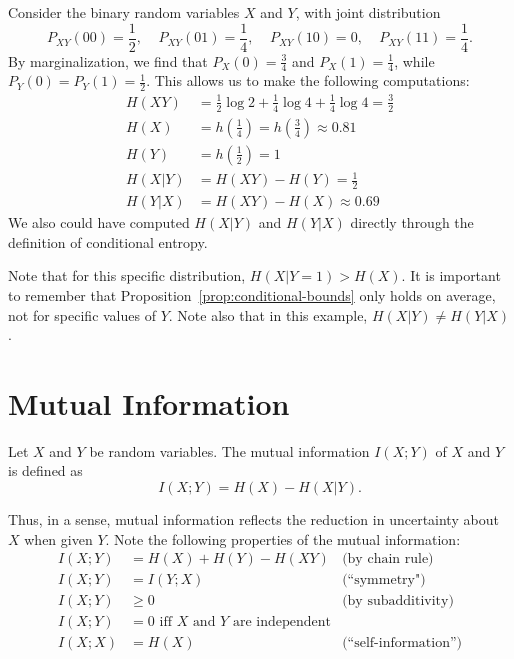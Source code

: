 \begin{example}\label{example:chain-rule}
Consider the binary random variables $X$ and $Y$, with joint distribution
\[
P_{XY}(00) = \frac{1}{2}, \ \ \ \ \ P_{XY}(01) = \frac{1}{4}, \ \ \ \ \ P_{XY}(10) = 0, \ \ \ \ \ P_{XY}(11) = \frac{1}{4}.
\]
By marginalization, we find that $P_X(0) = \frac{3}{4}$ and $P_X(1) = \frac{1}{4}$, while $P_Y(0) = P_Y(1) = \frac{1}{2}$. This allows us to make the following computations:
\begin{align}
H(XY) &= \frac{1}{2}\log 2 + \frac{1}{4} \log 4  + \frac{1}{4} \log 4 = \frac{3}{2}\\
H(X) &= h\left(\frac{1}{4}\right) = h\left(\frac{3}{4}\right) \approx 0.81\\
H(Y) &= h\left(\frac{1}{2}\right) = 1\\
H(X|Y) &= H(XY) - H(Y) = \frac{1}{2}\\
H(Y|X) &= H(XY) - H(X) \approx 0.69
\end{align}
We also could have computed $H(X|Y)$ and $H(Y|X)$ directly through the definition of conditional entropy.

Note that for this specific distribution, $H(X|Y=1) > H(X)$. It is important to remember that Proposition~\ref{prop:conditional-bounds} only holds on average, not for specific values of $Y$. Note also that in this example, $H(X|Y) \neq H(Y|X)$. 
\end{example}

\section{Mutual Information}
\begin{definition}\label{def:mutual-information}
Let $X$ and $Y$ be random variables. The mutual information
$I(X;Y)$ of $X$ and $Y$ is defined as
\[
I(X;Y)= H(X) - H(X|Y).
\]
\end{definition}
%
Thus, in a sense, mutual information reflects the reduction in
uncertainty about $X$ when given $Y$. Note the following properties of the mutual information:
\begin{align}
I(X;Y) &= H(X) + H(Y) - H(XY) &\mbox{(by chain rule)}\\
I(X;Y) &= I(Y;X) &\mbox{(``symmetry")}\\
I(X;Y) &\geq 0 &\mbox{(by subadditivity)}\\
I(X;Y) &= 0 \mbox{ iff $X$ and $Y$ are independent}\\
I(X;X) &= H(X) &\mbox{(``self-information'')}
\end{align}

